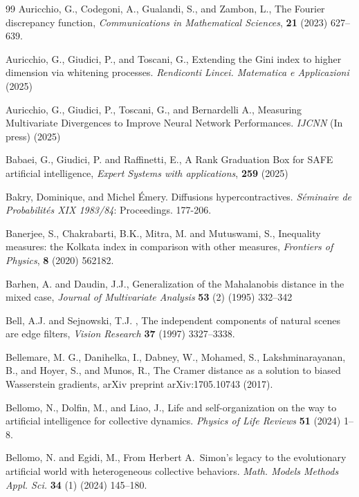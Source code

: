 \documentclass{article}
\begin{document}
\begin{thebibliography}{99}
Auricchio, G., Codegoni, A., Gualandi, S., and Zambon, L.,
The Fourier discrepancy function, \textit{Communications in Mathematical Sciences}, \textbf{21}  (2023) 627--639.



Auricchio, G.,  Giudici, P., and Toscani, G., Extending the Gini index to higher dimension via whitening processes.
\textit{Rendiconti Lincei. Matematica e Applicazioni} (2025)

Auricchio, G.,  Giudici, P., Toscani, G., and Bernardelli A., Measuring Multivariate Divergences to Improve Neural Network Performances.
\textit{IJCNN} (In press) (2025)

Babaei, G., Giudici, P. and Raffinetti, E., A Rank Graduation Box for SAFE artificial intelligence, \textit{Expert Systems with applications}, \textbf{259}  (2025)

Bakry, Dominique, and Michel Émery. Diffusions hypercontractives. \emph{Séminaire de Probabilités XIX 1983/84}: Proceedings. 177-206.


Banerjee, S., Chakrabarti, B.K., Mitra, M. and Mutuswami, S.,
Inequality measures: the Kolkata index in comparison with other measures, \textit{Frontiers of Physics}, \textbf{8}  (2020) 562182.

Barhen, A. and Daudin, J.J.,
Generalization of the {M}ahalanobis distance in the mixed case,
  \textit{Journal of Multivariate Analysis}  \textbf{53} (2)  (1995)
  332--342
 


Bell, A.J. and Sejnowski, T.J. , The independent components of natural scenes are edge filters, \emph{Vision Research} \textbf{37}  (1997) 3327--3338.

  Bellemare, M. G., Danihelka, I., Dabney, W., Mohamed, S., Lakshminarayanan, B., and Hoyer, S., and Munos, R., The Cramer distance as a solution to biased Wasserstein gradients, arXiv preprint arXiv:1705.10743 (2017).


Bellomo, N., Dolfin, M., and Liao, J.,
Life and self-organization on the way to artificial intelligence for collective dynamics.
\emph{Physics of Life Reviews} \textbf{51} (2024) 1--8.

Bellomo, N. and  Egidi, M., From Herbert A.~Simon's legacy to the evolutionary artificial world with heterogeneous collective behaviors.
\emph{Math. Models Methods Appl. Sci.} \textbf{34} (1) (2024) 145--180.



\end{thebibliography}
\end{document}
